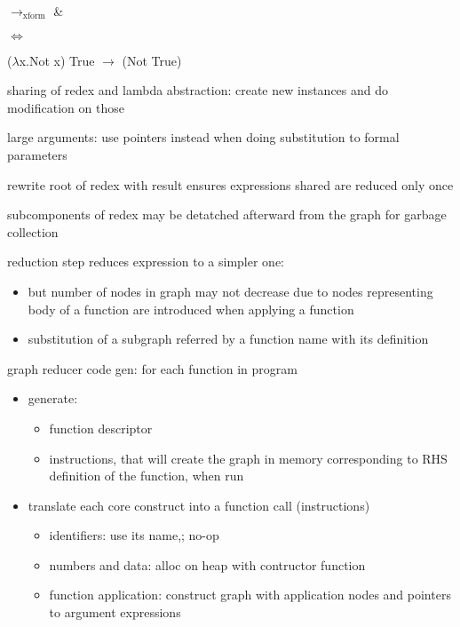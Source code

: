 \documentclass[8pt]{extarticle}
\begin{document}
\begin{multicols*}{2}
\begin{tblr}[]{}
$\rightarrow_{\text{xform}}$ &

\end{tblr}

$\iff$

($\lambda$x.Not x) True $\rightarrow$ (Not True)

sharing of redex and lambda abstraction: create new instances and do modification on those

large arguments: use pointers instead when doing substitution to formal parameters

rewrite root of redex with result ensures expressions shared are reduced only once

subcomponents of redex may be detatched afterward from the graph for garbage collection

reduction step reduces expression to a simpler one:
\begin{itemize}
\item but number of nodes in graph may not decrease due to nodes representing body of a function are introduced when applying a function
\item substitution of a subgraph referred by a function name with its definition
\end{itemize}

graph reducer code gen:
for each function in program
\begin{itemize}
  \item generate:
    \begin{itemize}
    \item function descriptor
    \item instructions, that will create the graph in memory corresponding to RHS definition of the function, when run
    \end{itemize}
  \item translate each core construct into a function call (instructions)
    \begin{itemize}
      \item identifiers: use its name,; no-op
      \item numbers and data: alloc on heap with contructor function
      \item function application: construct graph with application nodes and pointers to argument expressions
  \end{itemize}
\end{itemize}
  


\end{multicols*}
\end{document}
